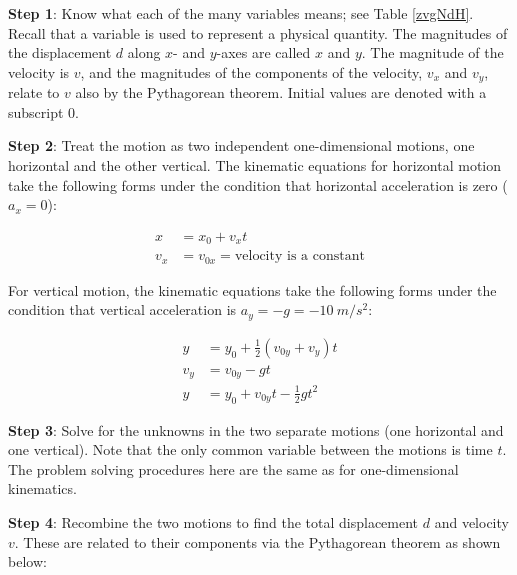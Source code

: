 \documentclass[main-physics.tex]{subfiles}
\begin{document}
\vspace{1em}

\textbf{Step 1}: Know what each of the many variables means; see Table \ref{zvgNdH}. Recall that a variable is used to represent a physical quantity. The magnitudes of the displacement $d$ along $x$- and $y$-axes are called $x$ and  $y$. The magnitude of the velocity is $v$, and the magnitudes of the components of the velocity, $v_x$ and $v_y$, relate to $v$ also by the Pythagorean theorem. Initial values are denoted with a subscript 0.

\vspace{1em}

\textbf{Step 2}: Treat the motion as two independent one-dimensional motions, one horizontal and the other vertical. The kinematic equations for horizontal motion take the following forms under the condition that horizontal acceleration is zero ($a_x = 0$):

\vspace{-1em}

\begin{align}
    x &= x_0 + v_x t \label{7fMAPG}\\[0.5ex]
    v_x &= v_{0x} = \text{velocity is a constant} \label{dCvDf4}
\end{align}

For vertical motion, the kinematic equations take the following forms under the condition that vertical acceleration is $a_y = -g = \SI{-10}{m/s^2}$:

\begin{align}
    y &= y_0 + \frac{1}{2}\left(v_{0y} + v_y\right)t\\[0.5ex]
    v_y &= v_{0y} - gt \label{SjYaoE} \\[0.5ex]
    y &= y_0 + v_{0y}t - \frac{1}{2}  g t^2  \label{36YuvF}
\end{align}

\vspace{1em}

\textbf{Step 3}: Solve for the unknowns in the two separate motions (one horizontal and one vertical). Note that the only common variable between the motions is time $t$. The problem solving procedures here are the same as for one-dimensional kinematics.

\vspace{1em}

\textbf{Step 4}: Recombine the two motions to find the total displacement $d$ and velocity $v$. These are related to their components via the Pythagorean theorem as shown below:
\end{document}
